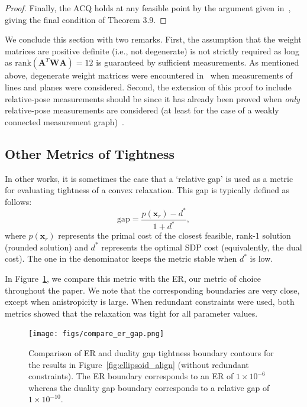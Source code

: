 \documentclass[lettersize,journal]{IEEEtran}
\newcommand{\rank}[1]{\mbox{rank}\left(#1\right)}
\newcommand{\rev}[1]{\color{red}{#1}\color{black}}
\begin{document}
\begin{proof}
Finally, the ACQ holds at any feasible point by the argument given in~\cite{cifuentesLocalStabilitySemidefinite2022}, giving the final condition of Theorem 3.9.
\end{proof}

We conclude this section with two remarks. First, the assumption that the weight matrices are positive definite (i.e., not degenerate) is not strictly required as long as $\rank{\bm{A}^T \bm{W} \bm{A}}=12$ is guaranteed by sufficient measurements. As mentioned above, degenerate weight matrices were encountered in~\cite{brialesConvexGlobal3D2017} when measurements of lines and planes were considered. Second, the extension of this proof to include relative-pose measurements should be \rev{possible} since it has already been proved when \emph{only} relative-pose measurements are considered (at least for the case of a weakly connected measurement graph)~\cite{rosenSESyncCertifiablyCorrect2019}.

% 

\subsection{Other Metrics of Tightness}\label{App:otherMetrics}

In other works, it is sometimes the case that a `relative gap' is used as a metric for evaluating tightness of a convex relaxation. This gap is typically defined as follows:
\begin{equation*}
	\mbox{gap} = \frac{p(\bm{x}_r)-d^*}{1+d^*},
\end{equation*}
where $p(\bm{x}_r)$ represents the primal cost of the closest feasible, rank-1 solution (rounded solution) and $d^*$ represents the optimal SDP cost (equivalently, the dual cost). The one in the denominator keeps the metric stable when $d^*$ is low. 

In Figure~\ref{fig:compare_er_gap}, we compare this metric with the ER, our metric of choice throughout the paper. We note that the corresponding boundaries are very close, except when anistropicity is large. When redundant constraints were used, both metrics showed that the relaxation was tight for all parameter values.

\begin{figure}[!ht]
	\centering
	\texttt{[image: figs/compare\_er\_gap.png]}
	\caption{Comparison of ER and duality gap tightness boundary contours for the results in Figure~\ref{fig:ellipsoid_align} (without redundant constraints). The ER boundary corresponds to an ER of $1\times10^{-6}$ whereas the duality gap boundary corresponds to a relative gap of $1\times10^{-10}$.}
	\label{fig:compare_er_gap}
\end{figure}
\end{document}
